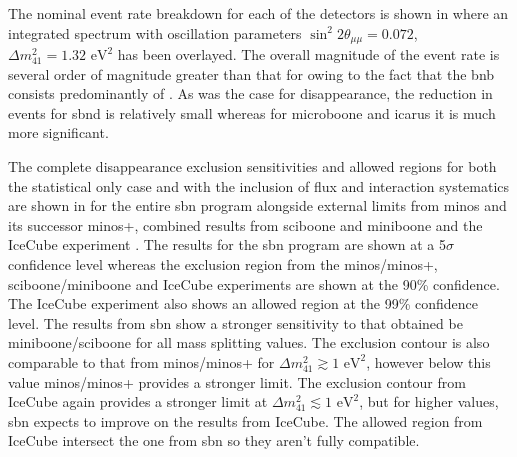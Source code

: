 The nominal event rate breakdown for each of the detectors is shown in  where an integrated spectrum with oscillation parameters $\sin^2{2\theta_{\mu \mu}} = 0.072$, $\Delta m^2_{41} = 1.32 \text{ eV}^2$ has been overlayed. The overall magnitude of the event rate is several order of magnitude greater than that for \nue owing to the fact that the \gls{bnb} consists predominantly of \numu. As was the case for \nue disappearance, the reduction in events for \gls{sbnd} is relatively small whereas for \gls{microboone} and \gls{icarus} it is much more significant.

The complete \numu disappearance exclusion sensitivities and allowed regions for both the statistical only case and with the inclusion of flux and interaction systematics are shown in  for the entire \gls{sbn} program alongside external limits from \gls{minos} and its successor \gls{minos}+, combined results from \gls{sciboone} and \gls{miniboone} and the IceCube experiment \cite{MINOS+} \cite{MiniBooNE/SciBooNE_numu_disapp_contour} \cite{IceCube_numu_disapp_contour}. The results for the \gls{sbn} program are shown at a 5$\sigma$ confidence level whereas the exclusion region from the \gls{minos}/\gls{minos}+, \gls{sciboone}/\gls{miniboone} and IceCube experiments are shown at the 90\% confidence. The IceCube experiment also shows an allowed region at the 99\% confidence level. The results from \gls{sbn} show a stronger sensitivity to that obtained be \gls{miniboone}/\gls{sciboone} for all mass splitting values. The exclusion contour is also comparable to that from \gls{minos}/\gls{minos}+ for $\Delta m^2_{41} \gtrsim 1\text{ eV}^2$, however below this value \gls{minos}/\gls{minos}+ provides a stronger limit. The exclusion contour from IceCube again provides a stronger limit at $\Delta m^2_{41} \lesssim 1\text{ eV}^2$, but for higher values, \gls{sbn} expects to improve on the results from IceCube. The allowed region from IceCube intersect the one from \gls{sbn} so they aren't fully compatible. 

